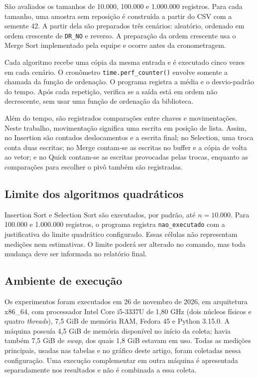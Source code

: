 \documentclass[12pt]{article}
\begin{document}
São avaliados os tamanhos de 10.000, 100.000 e 1.000.000 registros. Para cada
tamanho, uma amostra sem reposição é construída a partir do CSV com a semente
42. A partir dela são preparados três cenários: aleatório, ordenado em ordem
crescente de \texttt{DR\_NO} e reverso. A preparação da ordem crescente usa o
Merge Sort implementado pela equipe e ocorre antes da cronometragem.

Cada algoritmo recebe uma cópia da mesma entrada e é executado cinco vezes em
cada cenário. O cronômetro \texttt{time.perf\_counter()} envolve somente a
chamada da função de ordenação. O programa registra a média e o desvio-padrão
do tempo. Após cada repetição, verifica se a saída está em ordem não
decrescente, sem usar uma função de ordenação da biblioteca.

Além do tempo, são registrados comparações entre chaves e movimentações. Neste
trabalho, movimentação significa uma escrita em posição de lista. Assim, no
Insertion são contados deslocamentos e a escrita final; no Selection, uma troca
conta duas escritas; no Merge contam-se as escritas no buffer e a cópia de
volta ao vetor; e no Quick contam-se as escritas provocadas pelas trocas,
enquanto as comparações para escolher o pivô também são registradas.

\subsection{Limite dos algoritmos quadráticos}

Insertion Sort e Selection Sort são executados, por padrão, até
$n=10.000$. Para 100.000 e 1.000.000 registros, o programa registra
\texttt{nao\_executado} com a justificativa do limite quadrático configurado.
Essas células não representam medições nem estimativas. O limite poderá ser
alterado no comando, mas toda mudança deve ser informada no relatório final.

\subsection{Ambiente de execução}

Os experimentos foram executados em 26 de novembro de 2026, em arquitetura
x86\_64, com processador Intel Core i5-3337U de 1,80 GHz (dois núcleos físicos
e quatro \textit{threads}), 7,5 GiB de memória RAM, Fedora 45 e Python 3.15.0.
A máquina possuía 4,5 GiB de memória disponível no início da coleta; havia
também 7,5 GiB de \textit{swap}, dos quais 1,8 GiB estavam em uso. Todas as
medições principais, usadas nas tabelas e no gráfico deste artigo, foram
coletadas nessa configuração. Uma execução complementar em outra máquina é
apresentada separadamente nos resultados e não é combinada a essa coleta.
\end{document}
